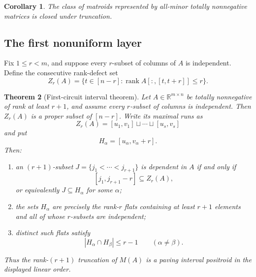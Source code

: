 \documentclass[11pt]{amsart}
\newtheorem{theorem}{Theorem}[section]
\newtheorem{corollary}[theorem]{Corollary}
\theoremstyle{definition}
\theoremstyle{remark}
\newcommand{\R}{\mathbb R}
\newcommand{\rank}{\operatorname{rank}}
\begin{document}
\begin{corollary}\label{cor:tn-truncation}
The class of matroids represented by all-minor totally nonnegative matrices is closed under truncation.
\end{corollary}

\subsection{The first nonuniform layer}

Fix $1\le r<m$, and suppose every $r$-subset of columns of $A$ is independent.  Define the consecutive rank-defect set
\begin{equation}\label{eq:Zr}
 Z_r(A)=\bigl\{t\in[n-r]:\rank A[:,[t,t+r]]\le r\bigr\}.
\end{equation}

\begin{theorem}[First-circuit interval theorem]\label{thm:first-circuit}
Let $A\in\R^{m\times n}$ be totally nonnegative of rank at least $r+1$, and assume every $r$-subset of columns is independent.  Then $Z_r(A)$ is a proper subset of $[n-r]$.  Write its maximal runs as
\[
 Z_r(A)=[u_1,v_1]\sqcup\cdots\sqcup[u_s,v_s]
\]
and put
\begin{equation}\label{eq:first-layer-H}
 H_\alpha=[u_\alpha,v_\alpha+r].
\end{equation}
Then:
\begin{enumerate}
\item an $(r+1)$-subset $J=\{j_1<\cdots<j_{r+1}\}$ is dependent in $A$ if and only if
\begin{equation}\label{eq:first-layer-support}
 [j_1,j_{r+1}-r]\subseteq Z_r(A),
\end{equation}
or equivalently $J\subseteq H_\alpha$ for some $\alpha$;
\item the sets $H_\alpha$ are precisely the rank-$r$ flats containing at least $r+1$ elements and all of whose $r$-subsets are independent;
\item distinct such flats satisfy
\begin{equation}\label{eq:first-layer-overlap}
 |H_\alpha\cap H_\beta|\le r-1\qquad(\alpha\ne\beta).
\end{equation}
\end{enumerate}
Thus the rank-$(r+1)$ truncation of $M(A)$ is a paving interval positroid in the displayed linear order.
\end{theorem}
\end{document}
